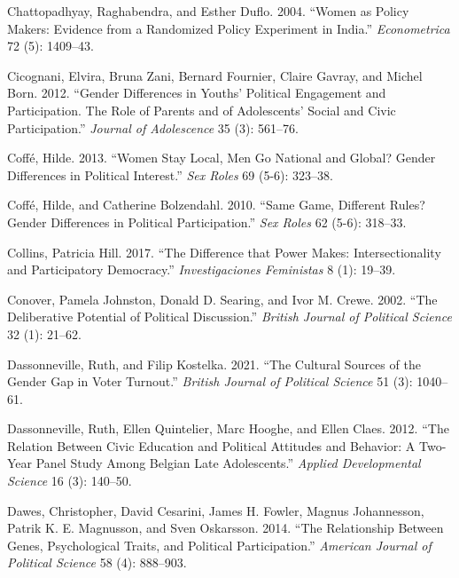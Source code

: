 \documentclass[
  letterpaper,
  DIV=11,
  numbers=noendperiod]{scrreprt}
\newlength{\cslhangindent}
\newlength{\cslentryspacingunit} %
\newenvironment{CSLReferences}[2] %
 {%
  \setlength{\parindent}{0pt}
  \ifodd #1
  \let\oldpar\par
  \def\par{\hangindent=\cslhangindent\oldpar}
  \fi
  \setlength{\parskip}{#2\cslentryspacingunit}
 }%
 {}
\begin{document}
\begin{CSLReferences}{1}{0}
\leavevmode{}%
Chattopadhyay, Raghabendra, and Esther Duflo. 2004. {``{Women as Policy
Makers: Evidence from a Randomized Policy Experiment in India}.''}
\emph{Econometrica} 72 (5): 1409--43.

\leavevmode{}%
Cicognani, Elvira, Bruna Zani, Bernard Fournier, Claire Gavray, and
Michel Born. 2012. {``{Gender Differences in Youths' Political
Engagement and Participation. The Role of Parents and of Adolescents'
Social and Civic Participation}.''} \emph{Journal of Adolescence} 35
(3): 561--76.

\leavevmode{}%
Coffé, Hilde. 2013. {``{Women Stay Local, Men Go National and Global?
Gender Differences in Political Interest}.''} \emph{Sex Roles} 69 (5-6):
323--38.

\leavevmode{}%
Coffé, Hilde, and Catherine Bolzendahl. 2010. {``{Same Game, Different
Rules? Gender Differences in Political Participation}.''} \emph{Sex
Roles} 62 (5-6): 318--33.

\leavevmode{}%
Collins, Patricia Hill. 2017. {``{The Difference that Power Makes:
Intersectionality and Participatory Democracy}.''} \emph{Investigaciones
Feministas} 8 (1): 19--39.

\leavevmode{}%
Conover, Pamela Johnston, Donald D. Searing, and Ivor M. Crewe. 2002.
{``{The Deliberative Potential of Political Discussion}.''}
\emph{British Journal of Political Science} 32 (1): 21--62.

\leavevmode{}%
Dassonneville, Ruth, and Filip Kostelka. 2021. {``{The Cultural Sources
of the Gender Gap in Voter Turnout}.''} \emph{{British Journal of
Political Science}} 51 (3): 1040--61.

\leavevmode{}%
Dassonneville, Ruth, Ellen Quintelier, Marc Hooghe, and Ellen Claes.
2012. {``{The Relation Between Civic Education and Political Attitudes
and Behavior: A Two-Year Panel Study Among Belgian Late Adolescents}.''}
\emph{Applied Developmental Science} 16 (3): 140--50.

\leavevmode{}%
Dawes, Christopher, David Cesarini, James H. Fowler, Magnus Johannesson,
Patrik K. E. Magnusson, and Sven Oskarsson. 2014. {``{The Relationship
Between Genes, Psychological Traits, and Political Participation}.''}
\emph{American Journal of Political Science} 58 (4): 888--903.


\end{CSLReferences}
\end{document}
